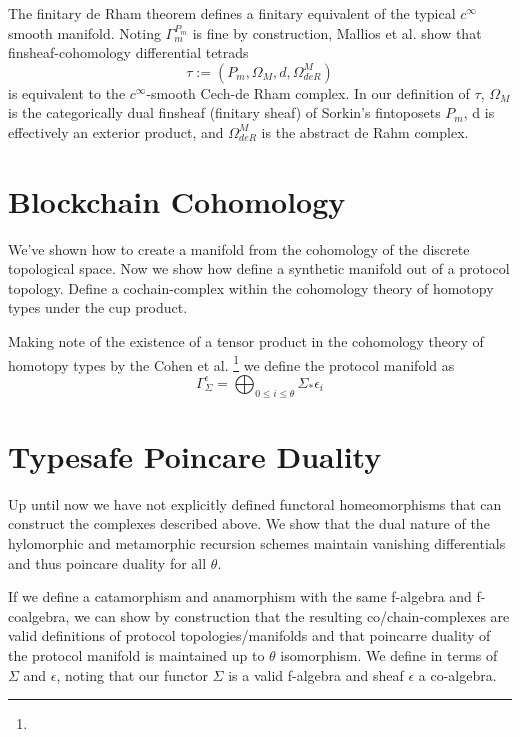 \documentclass{article}
\begin{document}
The finitary de Rham theorem defines a finitary equivalent of the typical $c^{\infty}$ smooth manifold. Noting $\Gamma^{P_m}_m$ is fine by construction, Mallios et al. show that finsheaf-cohomology differential tetrads
\begin{equation} \label{eq1}
\tau := (P_m, \Omega_M, d, \Omega^M_{deR})
\end{equation} \label{eq1}
is equivalent to the $c^{\infty}$-smooth Cech-de Rham complex. In our definition of $\tau$, $\Omega_M$ is the categorically dual finsheaf (finitary sheaf) of Sorkin's  fintoposets $P_m$, d is effectively an exterior product, and $ \Omega^M_{deR}$ is the abstract de Rahm complex.

\section{Blockchain Cohomology}
We've shown how to create a manifold from the cohomology of the discrete topological space. Now we show how define a synthetic manifold out of a protocol topology. Define a cochain-complex within the cohomology theory of homotopy types under the cup product.

Making note of the existence of a tensor product in the cohomology theory of homotopy types by the Cohen et al. \footnote{} we define the protocol manifold as 
\begin{equation} \label{eq1}
\Gamma^\epsilon_{\Sigma} = \bigoplus_{0 \leq i \leq \theta} \Sigma_* \epsilon_i
\end{equation} \label{eq1}

\section{Typesafe Poincare Duality}
Up until now we have not explicitly defined functoral homeomorphisms that can construct the complexes described above. We show that the dual nature of the hylomorphic and metamorphic recursion schemes maintain vanishing differentials and thus poincare duality for all $\theta$.

If we define a catamorphism and anamorphism with the same f-algebra and f-coalgebra, we can show by construction that the resulting co/chain-complexes are valid definitions of protocol topologies/manifolds and that poincarre duality of the protocol manifold is maintained up to $\theta$ isomorphism. We define in terms of $\Sigma$ and $\epsilon$, noting that our functor $\Sigma$ is a valid f-algebra and sheaf $\epsilon$ a co-algebra.
\end{document}
